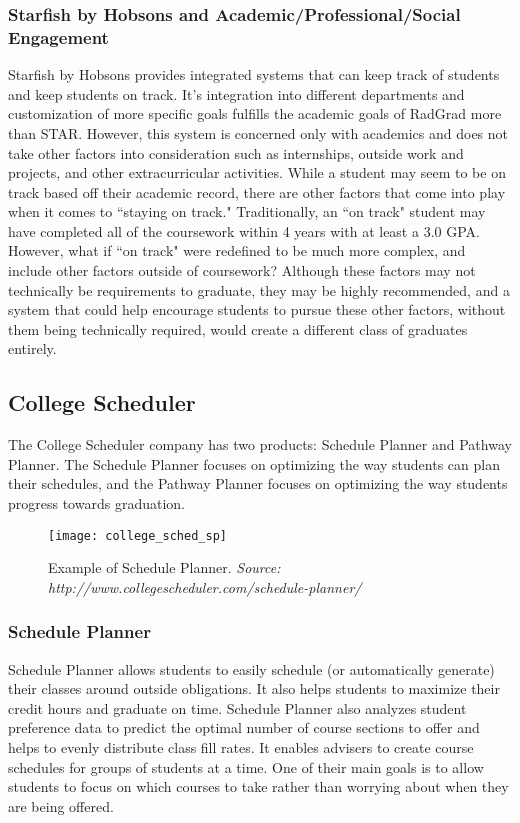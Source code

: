 \subsubsection{Starfish by Hobsons and Academic/Professional/Social Engagement}
Starfish by Hobsons provides integrated systems that can keep track of students and keep students on track. It's integration into different departments and customization of more specific goals fulfills the academic goals of RadGrad more than STAR. However, this system is concerned only with academics and does not take other factors into consideration such as internships, outside work and projects, and other extracurricular activities. While a student may seem to be on track based off their academic record, there are other factors that come into play when it comes to ``staying on track." Traditionally, an ``on track" student may have completed all of the coursework within 4 years with at least a 3.0 GPA. However, what if ``on track" were redefined to be much more complex, and include other factors outside of coursework? Although these factors may not technically be requirements to graduate, they may be highly recommended, and a system that could help encourage students to pursue these other factors, without them being technically required, would create a different class of graduates entirely. 

\subsection{College Scheduler}
The College Scheduler company has two products: Schedule Planner and Pathway Planner. The Schedule Planner focuses on optimizing the way students can plan their schedules, and the Pathway Planner focuses on optimizing the way students progress towards graduation.

\begin{figure}[h]
\centering
\texttt{[image: college\_sched\_sp]}
\caption{Example of Schedule Planner. \textit{Source: http://www.collegescheduler.com/schedule-planner/}}
\end{figure}


\subsubsection{Schedule Planner}
Schedule Planner allows students to easily schedule (or automatically generate) their classes around outside obligations. It also helps students to maximize their credit hours and graduate on time. Schedule Planner also analyzes student preference data to predict the optimal number of course sections to offer and helps to evenly distribute class fill rates. It enables advisers to create course schedules for groups of students at a time. One of their main goals is to allow students to focus on which courses to take rather than worrying about when they are being offered.

